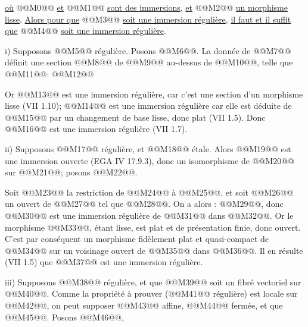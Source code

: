 
\uline{où} @@M0@@ \uline{et} @@M1@@
\uline{sont des immersions}, \uline{et} @@M2@@ \uline{un morphisme lisse}. \uline{Alors pour que} @@M3@@ \uline{soit une immersion régulière}, \uline{il faut et il suffit que} @@M4@@ \uline{soit une immersion régulière}.

i) Supposons @@M5@@ régulière. Posons @@M6@@. La donnée de @@M7@@ définit une section @@M8@@ de @@M9@@ au-dessus de @@M10@@, telle que @@M11@@:
@@M12@@

Or @@M13@@ est une immersion régulière, car c'est une section d'un morphisme lisse (VII 1.10); @@M14@@ est une immersion régulière car elle est déduite de @@M15@@ par un changement de base lisse, donc plat (VII 1.5). Donc @@M16@@ est une immersion régulière (VII 1.7).

ii) Supposons @@M17@@ régulière, et @@M18@@ étale. Alors @@M19@@ est une immersion ouverte (EGA IV 17.9.3), donc un isomorphisme de @@M20@@ sur @@M21@@; posons @@M22@@.

Soit @@M23@@ la restriction de @@M24@@ à @@M25@@, et soit @@M26@@ un ouvert de @@M27@@ tel que @@M28@@. On a alors : @@M29@@, donc @@M30@@ est une immersion régulière de @@M31@@ dans @@M32@@. Or le morphisme @@M33@@, étant lisse, est plat et de présentation finie, donc ouvert. C'est par conséquent un morphisme fidèlement plat et quasi-compact de @@M34@@ sur un voisinage ouvert de @@M35@@ dans @@M36@@. Il en résulte (VII 1.5) que @@M37@@ est une immersion régulière.

iii) Supposons @@M38@@ régulière, et que @@M39@@ soit un fibré vectoriel sur @@M40@@. Comme la propriété à prouver (@@M41@@ régulière) est locale sur @@M42@@, on peut supposer @@M43@@ affine, @@M44@@ fermée, et que @@M45@@. Posons @@M46@@,

